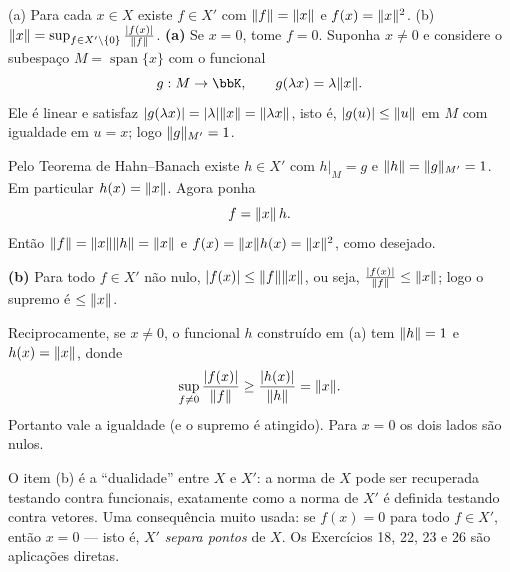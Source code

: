 \begin{exercicio}{(a) Para cada $x\in X$ existe $f\in X'$ com $\lVert f\rVert=\lVert x\rVert$ e $f(x)=\lVert x\rVert^2$. (b) $\lVert x\rVert=\sup_{f\in X'\setminus\{0\}}\frac{\lvert f(x)\rvert}{\lVert f\rVert}$.}
\sol
\textbf{(a)} Se $x=0$, tome $f=0$. Suponha $x\neq0$ e considere o subespaço $M=\operatorname{span}\{x\}$ com o funcional
\[ g:M\to\K,\qquad g(\lambda x)=\lambda\norm{x}. \]
Ele é linear e satisfaz $\lvert g(\lambda x)\rvert=\lvert\lambda\rvert\lVert x\rVert=\lVert\lambda x\rVert$, isto é, $\lvert g(u)\rvert\le\lVert u\rVert$ em $M$ com igualdade em $u=x$; logo $\lVert g\rVert_{M'}=1$.

Pelo Teorema de Hahn--Banach existe $h\in X'$ com $h|_M=g$ e $\lVert h\rVert=\lVert g\rVert_{M'}=1$. Em particular $h(x)=\lVert x\rVert$. Agora ponha
\[ f=\lVert x\rVert\,h. \]
Então $\lVert f\rVert=\lVert x\rVert\lVert h\rVert=\lVert x\rVert$ e $f(x)=\lVert x\rVert h(x)=\lVert x\rVert^2$, como desejado.

\textbf{(b)} Para todo $f\in X'$ não nulo, $\lvert f(x)\rvert\le\lVert f\rVert\lVert x\rVert$, ou seja, $\frac{\lvert f(x)\rvert}{\lVert f\rVert}\le\lVert x\rVert$; logo o supremo é $\le\lVert x\rVert$.

Reciprocamente, se $x\neq0$, o funcional $h$ construído em (a) tem $\lVert h\rVert=1$ e $h(x)=\lVert x\rVert$, donde
\[ \sup_{f\neq0}\frac{\lvert f(x)\rvert}{\lVert f\rVert}\ge\frac{\lvert h(x)\rvert}{\lVert h\rVert}=\lVert x\rVert. \]
Portanto vale a igualdade (e o supremo é atingido). Para $x=0$ os dois lados são nulos.

\begin{obs}
O item (b) é a ``dualidade'' entre $X$ e $X'$: a norma de $X$ pode ser recuperada testando contra funcionais, exatamente como a norma de $X'$ é definida testando contra vetores. Uma consequência muito usada: se $f(x)=0$ para todo $f\in X'$, então $x=0$ --- isto é, $X'$ \emph{separa pontos} de $X$. Os Exercícios 18, 22, 23 e 26 são aplicações diretas.
\end{obs}
\end{exercicio}
